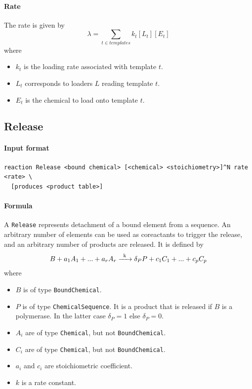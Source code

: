 \documentclass[12pt]{article}
\theoremstyle{definition}
\theoremstyle{remark}
\numberwithin{equation}{section}
\newcommand{\reactionIrr}[4]{#1 \ce{->[#3][#4]} #2}
\begin{document}
\paragraph{Rate} The rate is given by
$$
	\lambda = \sum_{t\in templates} k_t[L_t][E_t]
$$
where
\begin{itemize}
	\item $k_t$ is the loading rate associated with template $t$.
	\item $L_t$ corresponds to loaders $L$ reading template $t$.
	\item $E_t$ is the chemical to load onto template $t$.
\end{itemize}

\subsection{Release}
\paragraph{Input format}
\begin{verbatim}
reaction Release <bound chemical> [<chemical> <stoichiometry>]^N rate <rate> \
  [produces <product table>]
\end{verbatim}

\paragraph{Formula} A \texttt{Release} represents detachment of a bound element from a sequence. An arbitrary number of elements can be used as coreactants to trigger the release, and an arbitrary number of products are released. It is defined by
$$
	\reactionIrr{B + a_1 A_1 + ... + a_r A_r}{\delta_PP + c_1 C_1 + ... + c_p C_p }{k}{}
$$
where
\begin{itemize}
	\item $B$ is of type \texttt{BoundChemical}.
	\item $P$ is of type \texttt{ChemicalSequence}. It is a product that is released if $B$ is a polymerase. In the latter case $\delta_P = 1$ else $\delta_P = 0$.
	\item $A_i$ are of type \texttt{Chemical}, but not \texttt{BoundChemical}.
	\item $C_i$ are of type \texttt{Chemical}, but not \texttt{BoundChemical}.
	\item $a_i$ and $c_i$ are stoichiometric coefficient.
	\item $k$ is a rate constant.
\end{itemize}
\end{document}
